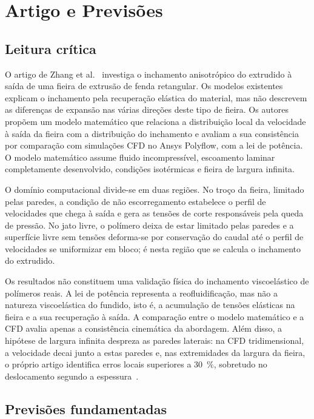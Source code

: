 \section{Artigo e Previsões}
\label{sec:artigo}

\subsection{Leitura crítica}
O artigo de Zhang et al.~\cite{Zhang2026Anisotropic} investiga o inchamento anisotrópico do extrudido à saída de uma fieira de extrusão de fenda retangular. Os modelos existentes explicam o inchamento pela recuperação elástica do material, mas não descrevem as diferenças de expansão nas várias direções deste tipo de fieira. Os autores propõem um modelo matemático que relaciona a distribuição local da velocidade à saída da fieira com a distribuição do inchamento e avaliam a sua consistência por comparação com simulações CFD no Ansys Polyflow, com a lei de potência. O modelo matemático assume fluido incompressível, escoamento laminar completamente desenvolvido, condições isotérmicas e fieira de largura infinita.

O domínio computacional divide-se em duas regiões. No troço da fieira, limitado pelas paredes, a condição de não escorregamento estabelece o perfil de velocidades que chega à saída e gera as tensões de corte responsáveis pela queda de pressão. No jato livre, o polímero deixa de estar limitado pelas paredes e a superfície livre sem tensões deforma-se por conservação do caudal até o perfil de velocidades se uniformizar em bloco; é nesta região que se calcula o inchamento do extrudido.

Os resultados não constituem uma validação física do inchamento viscoelástico de polímeros reais. A lei de potência representa a reofluidificação, mas não a natureza viscoelástica do fundido, isto é, a acumulação de tensões elásticas na fieira e a sua recuperação à saída. A comparação entre o modelo matemático e a CFD avalia apenas a consistência cinemática da abordagem. Além disso, a hipótese de largura infinita despreza as paredes laterais: na CFD tridimensional, a velocidade decai junto a estas paredes e, nas extremidades da largura da fieira, o próprio artigo identifica erros locais superiores a \qty{30}{\percent}, sobretudo no deslocamento segundo a espessura~\cite{Zhang2026Anisotropic}.

\subsection{Previsões fundamentadas}


